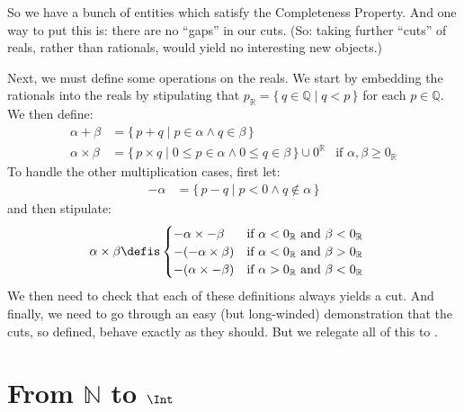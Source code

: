 \documentclass[10pt,a4paper]{article}
\makeatletter
\theoremstyle{plain}
\theoremstyle{definition}
\theoremstyle{remark}
\newcommand*{\olfileid}[3]{}
\newcommand*{\olsection}[1]{\section*{#1}}
\newcommand{\olref}{\@ifnextchar[{\olref@i}{\olref@final}}
\def\olref@i[#1]{\@ifnextchar[{\olref@ii}{\olref@final}}
\def\olref@ii[#1]{\@ifnextchar[{\olref@iii}{\olref@final}}
\def\olref@iii[#1]{\olref@final}
\def\olref@final#1{\ref{#1}}
\providecommand{\Nat}{\ensuremath{\mathbb{N}}}
\providecommand{\Rat}{\mathbb{Q}}
\providecommand{\Real}{\mathbb{R}}
\providecommand{\Setabs}[2]{\{\, #1 \mid #2 \,\}}
\makeatother
\begin{document}
So we have a bunch of entities which satisfy the Completeness
Property. And one way to put this is: there are no ``gaps'' in our
cuts. (So: taking further ``cuts'' of reals, rather than rationals,
would yield no interesting new objects.)

Next, we must define some operations on the reals. We start by
embedding the rationals into the reals by stipulating that $p_\Real =
\Setabs{q \in \Rat}{q < p}$ for each $p \in \Rat$. We then define:
\begin{align*}
	\alpha + \beta &= \Setabs{p + q}{p \in \alpha \land q \in \beta}\\
	\alpha \times \beta &= 
	\Setabs{p \times q}{0 \leq p \in \alpha \land 0 \leq q \in \beta} \cup 0^\mathbb{R} & \text{if }\alpha, \beta \geq 0_\Real
\end{align*}
To handle the other multiplication cases, first let: %
\begin{align*}
	-\alpha &= \Setabs{p - q}{p < 0 \land q \notin \alpha}
\end{align*}
and then stipulate:
\begin{align*}
	\alpha \times \beta &\defis 
	\begin{cases}
		\mathord{-}\alpha \times \mathord{-}\beta &\text{if }\alpha < 0_\Real\text{ and }\beta < 0_\Real\\
		\mathord{-}(\mathord{-}\alpha \times \beta) &\text{if }\alpha < 0_\Real \text{ and }\beta > 0_\Real\\
		\mathord{-}(\alpha \times \mathord{-}\beta) &\text{if }\alpha > 0_\Real \text{ and }\beta < 0_\Real
	\end{cases}
\end{align*}
We then need to check that each of these definitions always yields a
cut. And finally, we need to go through an easy (but long-winded)
demonstration that the cuts, so defined, behave exactly as they
should. But we relegate all of this to \olref[check]{sec}.




\olfileid{sfr}{arith}{int}
\olsection{From $\Nat$ to $\Int$}
\end{document}
